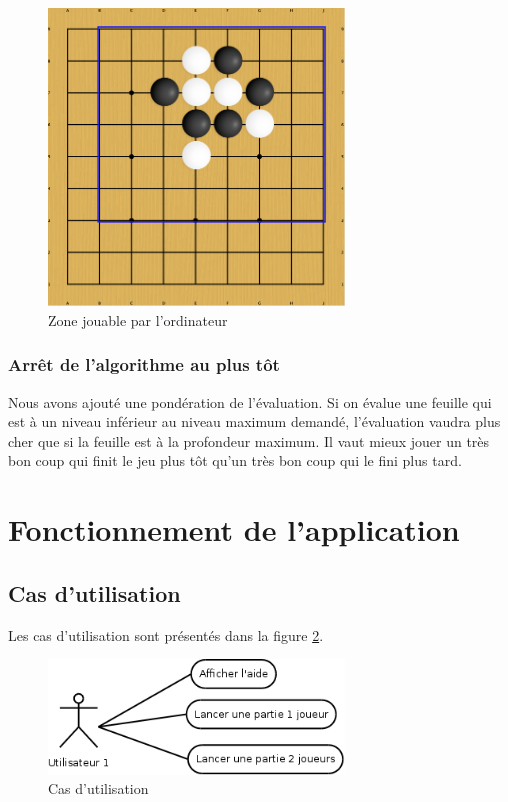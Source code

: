 \documentclass[11pt,a4paper,titlepage,french]{article}
\begin{document}
				\begin{figure}[hbt]
					\begin{center}
						\includegraphics[width=0.7\textwidth]{./rectangle-test.png}
					\end{center}
					\caption{Zone jouable par l'ordinateur}
					\label{rectangletest}
				\end{figure}


			\subsubsection{Arrêt de l'algorithme au plus tôt}
				Nous avons ajouté une pondération de l'évaluation. Si on évalue une feuille qui est à un niveau inférieur au niveau maximum demandé, l'évaluation vaudra plus cher que si la feuille est à la profondeur maximum. Il vaut mieux jouer un très bon coup qui finit le jeu plus tôt qu'un très bon coup qui le fini plus tard.


	\section{Fonctionnement de l'application}

		\subsection{Cas d'utilisation}
			Les cas d'utilisation sont présentés dans la figure \ref{use case}.

			\begin{figure}[ohbt]
				\begin{center}
					\includegraphics[width=0.7\textwidth]{./usecase.png}
				\end{center}
				\caption{Cas d'utilisation}
				\label{use case}
			\end{figure}
\end{document}
